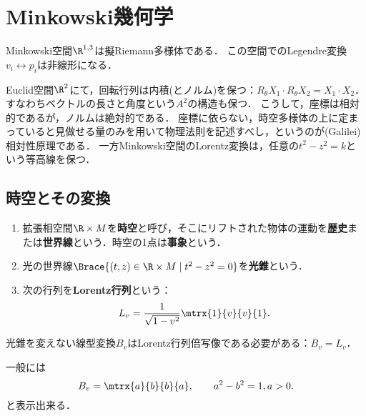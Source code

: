 \documentclass[uplatex,dvipdfmx]{jsreport}
\begin{document}
\section{Minkowski幾何学}

\begin{tcolorbox}[colframe=ForestGreen, colback=ForestGreen!10!white,breakable,colbacktitle=ForestGreen!40!white,coltitle=black,fonttitle=\bfseries\sffamily,
title=]
    Minkowski空間$\R^{1,3}$は擬Riemann多様体である．
    この空間でのLegendre変換$v_i\leftrightarrow p_i$は非線形になる．
\end{tcolorbox}

\begin{discussion}
    Euclid空間$\R^2$にて，回転行列は内積(とノルム)を保つ：$R_\theta X_1\cdot R_\theta X_2=X_1\cdot X_2$．
    すなわちベクトルの長さと角度という$A^2$の構造も保つ．
    こうして，座標は相対的であるが，ノルムは絶対的である．
    座標に依らない，時空多様体の上に定まっていると見做せる量のみを用いて物理法則を記述すべし，というのが(Galilei)相対性原理である．
    一方Minkowski空間のLorentz変換は，任意の$t^2-z^2=k$という等高線を保つ．
\end{discussion}

\subsection{時空とその変換}

\begin{definition}\mbox{}
    \begin{enumerate}
        \item 拡張相空間$\R\times M$を\textbf{時空}と呼び，そこにリフトされた物体の運動を\textbf{歴史}または\textbf{世界線}という．時空の1点は\textbf{事象}という．
        \item 光の世界線$\Brace{(t,z)\in\R\times M\mid t^2-z^2=0}$を\textbf{光錐}という．
        \item 次の行列を\textbf{Lorentz行列}という：
        \[L_v=\frac{1}{\sqrt{1-v^2}}\mtrx{1}{v}{v}{1}.\]
    \end{enumerate}
\end{definition}

\begin{theorem}
    光錐を変えない線型変換$B_v$はLorentz行列倍写像である必要がある：$B_v=L_v$．
\end{theorem}
\begin{remarks}
    一般には
    \[B_v=\mtrx{a}{b}{b}{a},\qquad a^2-b^2=1,a>0.\]
    と表示出来る．
\end{remarks}
\end{document}
